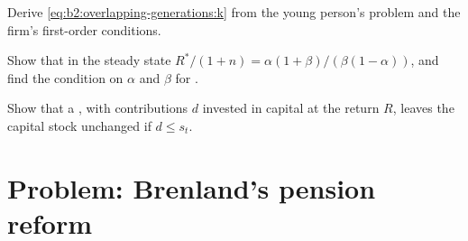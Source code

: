 \begin{exercise}[$\star\star\star$]\label{exo:b2:overlapping-generations:10}
Derive \eqref{eq:b2:overlapping-generations:k} from the young person's problem and the firm's first-order conditions.
\end{exercise}

\begin{exercise}[$\star\star\star$]\label{exo:b2:overlapping-generations:11}
Show that in the steady state $R^*/(1 + n) = \alpha(1 + \beta)/(\beta(1 - \alpha))$, and find the condition on $\alpha$ and $\beta$ for .
\end{exercise}

\begin{exercise}[$\star\star\star$]\label{exo:b2:overlapping-generations:12}
Show that a , with contributions $d$ invested in capital at the return $R$, leaves the capital stock unchanged if
$d \le s_t$.
\end{exercise}

\section{Problem: Brenland's pension reform}\label{sec:b2:overlapping-generations:problem}

